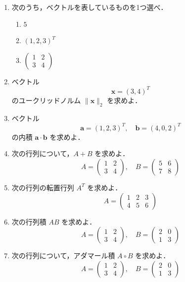 \documentclass[uplatex,a4paper,12pt]{jsarticle}
\begin{document}
\begin{enumerate}

\item 次のうち，ベクトルを表しているものを1つ選べ．
\begin{enumerate}[label=(\alph*)]
\item $5$
\item $(1,2,3)^T$
\item $\begin{pmatrix}1&2\\3&4\end{pmatrix}$
\end{enumerate}

\item ベクトル
\[
\mathbf{x}=(3,4)^T
\]
のユークリッドノルム $\|\mathbf{x}\|_2$ を求めよ．

\item ベクトル
\[
\mathbf{a}=(1,2,3)^T,\quad
\mathbf{b}=(4,0,2)^T
\]
の内積 $\mathbf{a}\cdot\mathbf{b}$ を求めよ．

\item 次の行列について，$A+B$ を求めよ．
\[
A=
\begin{pmatrix}
1&2\\
3&4
\end{pmatrix},
\quad
B=
\begin{pmatrix}
5&6\\
7&8
\end{pmatrix}
\]

\item 次の行列の転置行列 $A^T$ を求めよ．
\[
A=
\begin{pmatrix}
1&2&3\\
4&5&6
\end{pmatrix}
\]

\item 次の行列積 $AB$ を求めよ．
\[
A=
\begin{pmatrix}
1&2\\
3&4
\end{pmatrix},
\quad
B=
\begin{pmatrix}
2&0\\
1&3
\end{pmatrix}
\]

\item 次の行列について，アダマール積 $A\circ B$ を求めよ．
\[
A=
\begin{pmatrix}
1&2\\
3&4
\end{pmatrix},
\quad
B=
\begin{pmatrix}
2&0\\
1&3
\end{pmatrix}
\]


\end{enumerate}
\end{document}
